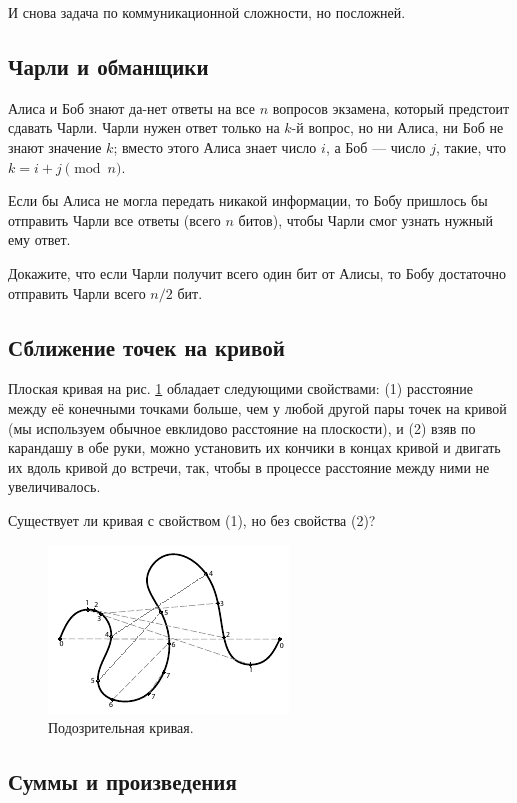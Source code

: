\medskip

И снова задача по коммуникационной сложности, но посложней.

\subsection*{Чарли и обманщики}

Алиса и Боб знают да-нет ответы на все $n$ вопросов экзамена, который предстоит сдавать Чарли.
Чарли нужен ответ только на $k$-й вопрос, но ни Алиса, ни Боб не знают значение $k$;
вместо этого Алиса знает число $i$, а Боб --- число $j$, такие, что $k = i + j \pmod n$.

Если бы Алиса не могла передать никакой информации,
то Бобу пришлось бы отправить Чарли все ответы (всего $n$ битов), чтобы Чарли смог узнать нужный ему ответ.

Докажите, что если Чарли получит всего один бит от Алисы, то Бобу достаточно отправить Чарли всего $n/2$ бит.

\subsection*{Сближение точек на кривой}

Плоская кривая на рис. \ref{pic:s-curv} обладает следующими свойствами:
(1) расстояние между её конечными точками больше, чем у любой другой пары точек на кривой (мы используем обычное евклидово расстояние на плоскости),
и
(2) взяв по карандашу в обе руки, можно установить их кончики в концах кривой и двигать их вдоль кривой до встречи, так, чтобы в процессе расстояние между ними не увеличивалось.

Существует ли кривая с свойством (1), но без свойства (2)?

\begin{figure}[htb!]
\centering
\includegraphics[scale=1]{pics/s-curve}
\caption{Подозрительная кривая.}
\label{pic:s-curv}
\end{figure}

\subsection*{Суммы и произведения}

